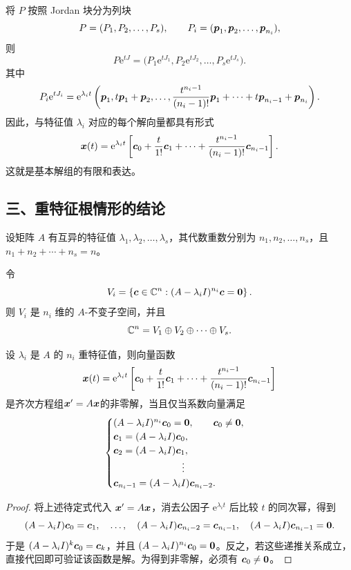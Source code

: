将 $P$ 按照 Jordan 块分为列块
\[
	P=(P_1,P_2,\ldots,P_s),
	\qquad
	P_i=(\boldsymbol{p}_1,\boldsymbol{p}_2,\ldots,\boldsymbol{p}_{n_i}),
\]
则
\[
	P\mathrm{e}^{tJ}
	=\bigl(P_1\mathrm{e}^{tJ_1},
	P_2\mathrm{e}^{tJ_2},\ldots,
	P_s\mathrm{e}^{tJ_s}\bigr).
\]
其中
\[
	P_i\mathrm{e}^{tJ_i}
	=\mathrm{e}^{\lambda_it}
	\left(
	\boldsymbol{p}_1,
	t\boldsymbol{p}_1+\boldsymbol{p}_2,
	\ldots,
	\dfrac{t^{n_i-1}}{(n_i-1)!}\boldsymbol{p}_1
	+\cdots+t\boldsymbol{p}_{n_i-1}+\boldsymbol{p}_{n_i}
	\right).
\]
因此，与特征值 $\lambda_i$ 对应的每个解向量都具有形式
\[
	\boldsymbol{x}(t)
	=\mathrm{e}^{\lambda_it}
	\left[
		\boldsymbol{c}_0+\dfrac{t}{1!}\boldsymbol{c}_1+\cdots
		+\dfrac{t^{n_i-1}}{(n_i-1)!}\boldsymbol{c}_{n_i-1}
	\right].
\]
这就是基本解组的有限和表达。

\subsection*{三、重特征根情形的结论}

设矩阵 $A$ 有互异的特征值
$\lambda_1,\lambda_2,\ldots,\lambda_s$，其代数重数分别为
$n_1,n_2,\ldots,n_s$，且 $n_1+n_2+\cdots+n_s=n$。

\begin{lemma}\label{lem:广义特征子空间分解}
	令
	\[
		V_i
		=\left\{
		\boldsymbol{c}\in\mathbb{C}^n:
		(A-\lambda_iI)^{n_i}\boldsymbol{c}=\boldsymbol{0}
		\right\}.
	\]
	则 $V_i$ 是 $n_i$ 维的 $A$-不变子空间，并且
	\[
		\mathbb{C}^n=V_1\oplus V_2\oplus\cdots\oplus V_s.
	\]
\end{lemma}
\begin{lemma}[待定系数的确定]\label{lem:向量多项式解的递推条件}
	设 $\lambda_i$ 是 $A$ 的 $n_i$ 重特征值，则向量函数
	\[
		\boldsymbol{x}(t)
		=\mathrm{e}^{\lambda_it}
		\left[
			\boldsymbol{c}_0+\dfrac{t}{1!}\boldsymbol{c}_1+\cdots
			+\dfrac{t^{n_i-1}}{(n_i-1)!}\boldsymbol{c}_{n_i-1}
		\right]
	\]
	是齐次方程组$\boldsymbol{x}'=A\boldsymbol{x}$的非零解，当且仅当系数向量满足
	\[
		\begin{cases}
			(A-\lambda_iI)^{n_i}\boldsymbol{c}_0=\boldsymbol{0},
			\qquad \boldsymbol{c}_0\neq\boldsymbol{0},\\
			\boldsymbol{c}_1=(A-\lambda_iI)\boldsymbol{c}_0,\\
			\boldsymbol{c}_2=(A-\lambda_iI)\boldsymbol{c}_1,\\
			\hspace{2.5cm}\vdots\\
			\boldsymbol{c}_{n_i-1}
			=(A-\lambda_iI)\boldsymbol{c}_{n_i-2}.
		\end{cases}
	\]
\end{lemma}

\begin{proof}
	将上述待定式代入 $\boldsymbol{x}'=A\boldsymbol{x}$，消去公因子
	$\mathrm{e}^{\lambda_it}$ 后比较 $t$ 的同次幂，得到
	\[
		(A-\lambda_iI)\boldsymbol{c}_0=\boldsymbol{c}_1,
		\quad\ldots,\quad
		(A-\lambda_iI)\boldsymbol{c}_{n_i-2}=\boldsymbol{c}_{n_i-1},
		\quad
		(A-\lambda_iI)\boldsymbol{c}_{n_i-1}=\boldsymbol{0}.
	\]
	于是
	$(A-\lambda_iI)^k\boldsymbol{c}_0=\boldsymbol{c}_k$，并且
	$(A-\lambda_iI)^{n_i}\boldsymbol{c}_0=\boldsymbol{0}$。反之，若这些递推关系成立，
	直接代回即可验证该函数是解。为得到非零解，必须有
	$\boldsymbol{c}_0\neq\boldsymbol{0}$。
\end{proof}

